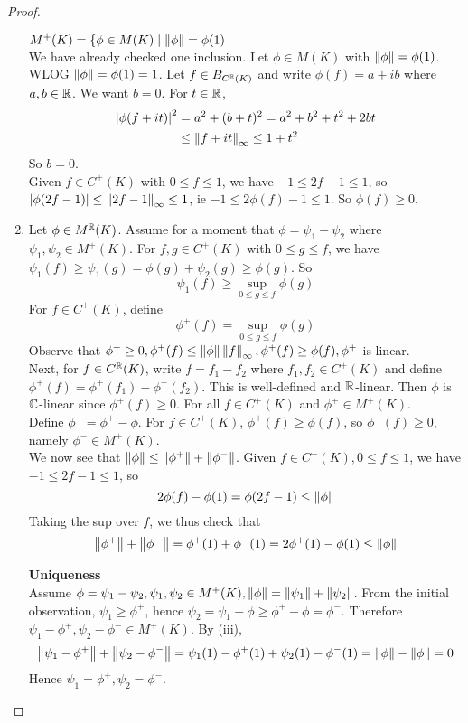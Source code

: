 \documentclass{article}
\begin{document}
\begin{proof}
\begin{enumerate}
    {\bf $M^+(K) = \{\phi \in M(K) \mid \left\lVert \phi\right\rVert = \phi(1)$} \\
    We have already checked one inclusion. Let $\phi \in M(K)$ with $\left\lVert \phi\right\rVert = \phi(1)$. WLOG $\left\lVert \phi\right\rVert = \phi(1) = 1$. Let $f \in B_{C^\mathbb R(K)}$ and write $\phi(f) = a + ib$ where $a, b \in \mathbb R$. We want $b = 0$. For $t \in \mathbb R$,
    \begin{align*}
      \left\lvert \phi(f + it)\right\rvert^2
      & = a^2 + (b + t)^2 = a^2 + b^2 + t^2 + 2bt \\
      & \le \left\lVert f + it\right\rVert_\infty \le 1 + t^2
    \end{align*}
    So $b = 0$. \\
    Given $f \in C^+(K)$ with $0 \le f \le 1$, we have $-1 \le 2f - 1 \le 1$, so $\left\lvert \phi(2f - 1)\right\rvert \le \left\lVert 2f - 1\right\rVert_\infty \le 1$, ie $-1 \le 2\phi(f) - 1 \le 1$. So $\phi(f) \ge 0$.
    \item Let $\phi \in M^\mathbb R(K)$. Assume for a moment that $\phi = \psi_1 - \psi_2$ where $\psi_1, \psi_2 \in M^+(K)$. For $f, g \in C^+(K)$ with $0 \le g \le f$, we have $\psi_1(f) \ge \psi_1(g) = \phi(g) + \psi_2(g) \ge \phi(g)$. So
    $$\psi_1(f) \ge \sup_{0 \le g \le f} \phi(g)$$
    For $f \in C^+(K)$, define
    $$\phi^+(f) = \sup_{0 \le g \le f} \phi(g)$$
    Observe that $\phi^+ \ge 0, \phi^+(f) \le \left\lVert \phi\right\rVert \left\lVert f\right\rVert_\infty, \phi^+(f) \ge \phi(f), \phi^+$ is linear. \\
    Next, for $f \in C^\mathbb R(K)$, write $f = f_1 - f_2$ where $f_1, f_2 \in C^+(K)$ and define $\phi^+(f) = \phi^+(f_1) - \phi^+(f_2)$. This is well-defined and $\mathbb R$-linear. Then $\phi$ is $\mathbb C$-linear since $\phi^+(f) \ge 0$. For all $f \in C^+(K)$ and $\phi^+ \in M^+(K)$. \\
    Define $\phi^- = \phi^+ - \phi$. For $f \in C^+(K)$, $\phi^+(f) \ge \phi(f)$, so $\phi^-(f) \ge 0$, namely $\phi^- \in M^+(K)$. \\
    We now see that $\left\lVert \phi\right\rVert \le \left\lVert \phi^+\right\rVert + \left\lVert \phi^-\right\rVert$.
    Given $f \in C^+(K), 0 \le f \le 1$, we have $-1 \le 2f - 1 \le 1$, so
    $$2\phi(f) - \phi(1) = \phi(2f - 1) \le \left\lVert \phi\right\rVert$$
    Taking the sup over $f$, we thus check that
    $$\left\lVert \phi^+\right\rVert + \left\lVert \phi^-\right\rVert = \phi^+(1) + \phi^-(1) = 2\phi^+(1) - \phi(1) \le \left\lVert \phi\right\rVert$$

    {\bf Uniqueness} \\
    Assume $\phi = \psi_1 - \psi_2, \psi_1, \psi_2 \in M^+(K), \left\lVert \phi\right\rVert = \left\lVert \psi_1\right\rVert + \left\lVert \psi_2\right\rVert$. From the initial observation, $\psi_1 \ge \phi^+$, hence $\psi_2 = \psi_1 - \phi \ge \phi^+ - \phi = \phi^-$. Therefore $\psi_1 - \phi^+, \psi_2 - \phi^- \in M^+(K)$. By (iii),
    $$\left\lVert \psi_1 - \phi^+\right\rVert + \left\lVert \psi_2 - \phi^-\right\rVert = \psi_1(1) - \phi^+(1) + \psi_2(1) - \phi^-(1) = \left\lVert \phi\right\rVert - \left\lVert \phi\right\rVert = 0$$
    Hence $\psi_1 = \phi^+, \psi_2 = \phi^-$.
  \end{enumerate}
\end{proof}
\end{document}
